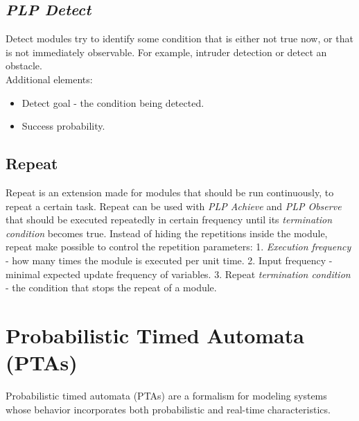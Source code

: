 \subsection{\textit{PLP Detect} \label{plp_detect}}
Detect modules try to identify some condition that is either not true now, or that is not immediately observable. For example, intruder detection or detect an obstacle.\\
Additional elements:
\begin{itemize}
\item Detect goal - the condition being detected.
\item Success probability.
\end{itemize}
\subsection{Repeat \label{plp_repeat}}
Repeat is an extension made for modules that should be run continuously, to repeat a certain task. Repeat can be used with \textit{PLP Achieve} and \textit{PLP Observe} that should be executed repeatedly in certain frequency until its \textit{termination condition} becomes true. Instead of hiding the repetitions inside the module, repeat make possible to control the repetition parameters: 1. \textit{Execution frequency} - how many times the module is executed per unit time. 2. Input frequency - minimal expected update frequency of variables. 3. Repeat \textit{termination condition} - the condition that stops the repeat of a module.\\
\section{Probabilistic Timed Automata (PTAs)}
Probabilistic timed automata (PTAs) are a formalism for modeling systems whose behavior incorporates both probabilistic and real-time characteristics. \cite{norman2013model} \cite{kwiatkowska2009stochastic}\\
